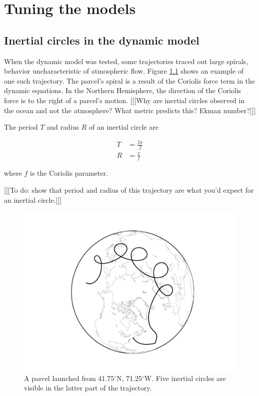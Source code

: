 \chapter{Tuning the models}

\section{Inertial circles in the dynamic model}

When the dynamic model was tested, some trajectories traced out large spirals, behavior uncharacteristic of atmospheric flow.
Figure \ref{fig:boston_inertial} shows an example of one such trajectory.
The parcel's spiral is a result of the Coriolis force term in the dynamic equations.
In the Northern Hemisphere, the direction of the Coriolis force is to the right of a parcel's motion.
[[[Why are inertial circles observed in the ocean and not the atmosphere? What metric predicts this? Ekman number?]]]

The period $T$ and radius $R$ of an inertial circle are

\begin{align}
    T &= \frac{2 \pi}{f} \\
    R &= \frac{v}{f}
\end{align}

where $f$ is the Coriolis parameter.

[[[To do: show that period and radius of this trajectory are what you'd expect for an inertial circle.]]]

\begin{figure}
    \centering
    \includegraphics[width=\textwidth]{boston_inertial.pdf}
    \caption{A parcel launched from 41.75$^\circ$N, 71.25$^\circ$W. Five inertial circles are visible in the latter part of the trajectory.}
    \label{fig:boston_inertial}
\end{figure}

